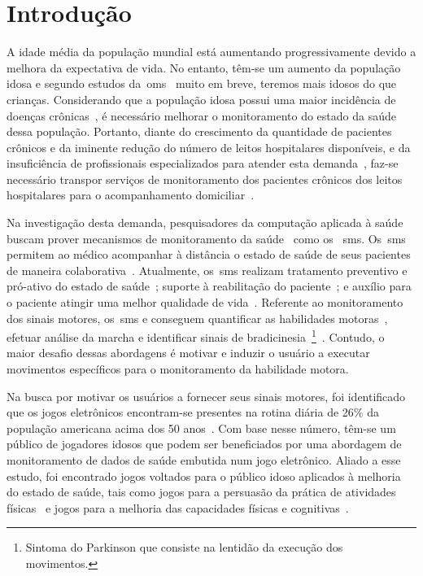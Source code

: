 \chapter{Introdu\c{c}\~{a}o} \label{chapter:intro}

A idade média da população mundial está aumentando progressivamente devido a melhora da expectativa de vida. No entanto, têm-se um aumento da população idosa e segundo estudos da~\ac{oms}~\cite{ageing2011} muito em breve, teremos mais idosos do que crianças. Considerando que a população idosa possui uma maior incidência de doenças crônicas~\cite{prevcronica2009}, é necessário melhorar o monitoramento do estado da saúde dessa população. Portanto, diante do crescimento da quantidade de pacientes crônicos e da iminente redução do número de leitos hospitalares disponíveis, e da insuficiência de profissionais especializados para atender esta demanda~\cite{healthmonitoring2013}, faz-se necessário transpor serviços de monitoramento dos pacientes crônicos dos leitos hospitalares para o acompanhamento domiciliar~\cite{homecarebrazil2011}. 

Na investigação desta demanda, pesquisadores da computação aplicada à saúde buscam prover mecanismos de monitoramento da saúde~\cite{healthmonitoring2013,bardram2010,aarhus_negotiating_2010} como os ~\ac{sms}. Os~\ac{sms} permitem ao médico acompanhar à distância o estado de saúde de seus pacientes de maneira colaborativa~\cite{healthmonitoring2013}. Atualmente, os~\ac{sms} realizam tratamento preventivo e pró-ativo do estado de saúde~\cite{bardram2010}; suporte à reabilitação do paciente~\cite{sacbespoke2014}; e auxílio para o paciente atingir uma melhor qualidade de vida~\cite{sacsvmhms2014}. Referente ao monitoramento dos sinais motores, os~\ac{sms} e conseguem quantificar as habilidades motoras~\cite{manumeterjbhi2014,patel_monitoring_2009}, efetuar análise da marcha \cite{robotgait2014} e identificar sinais de bradicinesia~\footnote{Sintoma do Parkinson que consiste na lentidão da execução dos movimentos.}~\cite{ambulatoryparkinson2010}. Contudo, o maior desafio dessas abordagens é motivar e induzir o usuário a executar movimentos específicos para o monitoramento da habilidade motora.

Na busca por motivar os usuários a fornecer seus sinais motores, foi identificado que os jogos eletrônicos encontram-se presentes na rotina diária de 26\% da população americana acima dos 50 anos~\cite{esa2016}. Com base nesse número, têm-se um público de jogadores idosos que podem ser beneficiados por uma abordagem de monitoramento de dados de saúde embutida num jogo eletrônico. Aliado a esse estudo, foi encontrado jogos voltados para o público idoso aplicados à melhoria do estado de saúde, tais como jogos para a persuasão da prática de atividades físicas~\cite{seriousgameolder2015} e jogos para a melhoria das capacidades físicas e cognitivas~\cite{arntzen2011}. 


